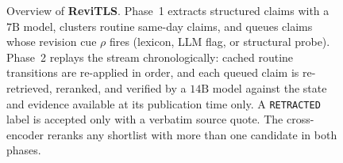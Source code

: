 \begin{figure}[t]
{%
}
\caption{Overview of \textbf{ReviTLS}. Phase~1 extracts structured claims with a $7\text{B}$ model, clusters routine same-day claims, and queues claims whose revision cue $\rho$ fires (lexicon, LLM flag, or structural probe). Phase~2 replays the stream chronologically: cached routine transitions are re-applied in order, and each queued claim is re-retrieved, reranked, and verified by a $14\text{B}$ model against the state and evidence available at its publication time only. A \texttt{RETRACTED} label is accepted only with a verbatim source quote. The cross-encoder reranks any shortlist with more than one candidate in both phases.}
\label{fig:architecture}
\end{figure}
